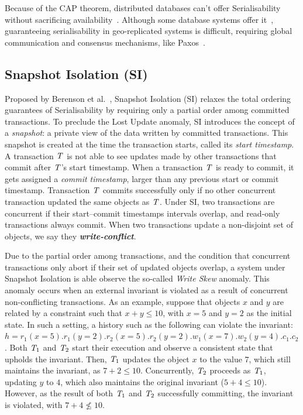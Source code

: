 Because of the CAP theorem, distributed databases can't offer Serialisability without sacrificing availability~\citep{cap-brewer, cap-theorem}. Although some database systems offer it~\citep{google_spanner}, guaranteeing serialisability in geo-replicated systems is difficult, requiring global communication and consensus mechanisms, like Paxos~\citep{lamport_paxos}.

\subsection{Snapshot Isolation (SI)}
\label{sect:si}

Proposed by Berenson et al.~\citep{sql-critique}, Snapshot Isolation (SI) relaxes the total ordering guarantees of Serialisability by requiring only a partial order among committed transactions. To preclude the Lost Update anomaly, SI introduces the concept of a \emph{snapshot}: a private view of the data written by committed transactions. This snapshot is created at the time the transaction starts, called its \emph{start timestamp}. A transaction $\mathit{T}$ is not able to see updates made by other transactions that commit after $\mathit{T}$'s start timestamp. When a transaction $\mathit{T}$ is ready to commit, it gets assigned a \emph{commit timestamp}, larger than any previous start or commit timestamp. Transaction $\mathit{T}$ commits successfully only if no other concurrent transaction updated the same objects as $\mathit{T}$. Under SI, two transactions are concurrent if their start--commit timestamps intervals overlap, and read-only transactions always commit. When two transactions update a non-disjoint set of objects, we say they \textbf{\em write-conflict}.

Due to the partial order among transactions, and the condition that concurrent transactions only abort if their set of updated objects overlap, a system under Snapshot Isolation is able observe the so-called \emph{Write Skew} anomaly. This anomaly occurs when an external invariant is violated as a result of concurrent non-conflicting transactions. As an example, suppose that objects $x$ and $y$ are related by a constraint such that $x + y \le 10$, with $x = 5$ and $y = 2$ as the initial state. In such a setting, a history such as the following can violate the invariant: $h = r_1(x=5).r_1(y=2).r_2(x=5).r_2(y=2).w_1(x=7).w_2(y=4).c_1.c_2$. Both $\mathit{T}_1$ and $\mathit{T}_2$ start their execution and observe a consistent state that upholds the invariant. Then, $\mathit{T}_1$ updates the object $x$ to the value $7$, which still maintains the invariant, as $7 + 2 \le 10$. Concurrently, $\mathit{T}_2$ proceeds as $\mathit{T}_1$, updating $y$ to $4$, which also maintains the original invariant ($5 + 4 \le 10$). However, as the result of both $\mathit{T}_1$ and $\mathit{T}_2$ successfully committing, the invariant is violated, with $7 + 4 \not\le 10$.

